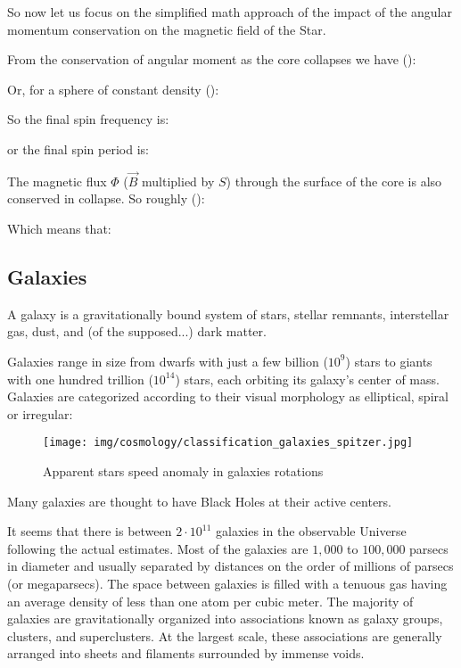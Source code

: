 	So now let us focus on the simplified math approach of the impact of the angular momentum conservation on the magnetic field of the Star. 
	
	From the conservation of angular moment as the core collapses we have ():
	
	Or,  for a sphere of constant density  ():
	
	So the final spin frequency is:
	
	or the final spin period is:
	
	The magnetic flux $\Phi$ ($\vec{B}$ multiplied by $S$) through the surface of the core is also conserved in collapse. So roughly   ():
	
	Which means that:
	
	
	\subsection{Galaxies}
	A galaxy is a gravitationally bound system of stars, stellar remnants, interstellar gas, dust, and (of the supposed...) dark matter. 

	Galaxies range in size from dwarfs with just a few billion ($10^9$) stars to giants with one hundred trillion ($10^{14}$) stars, each orbiting its galaxy's center of mass. Galaxies are categorized according to their visual morphology as elliptical, spiral or irregular:
	\begin{figure}[H]
		\begin{center}
		\texttt{[image: img/cosmology/classification\_galaxies\_spitzer.jpg]}
		\end{center}	
		\caption{Apparent stars speed anomaly in galaxies rotations}
	\end{figure}
	 Many galaxies are thought to have Black Holes at their active centers. 

	It seems that there is between $2\cdot 10^{11}$ galaxies in the observable Universe following the actual estimates. Most of the galaxies are $1,000$ to $100,000$ parsecs in diameter and usually separated by distances on the order of millions of parsecs (or megaparsecs). The space between galaxies is filled with a tenuous gas having an average density of less than one atom per cubic meter. The majority of galaxies are gravitationally organized into associations known as galaxy groups, clusters, and superclusters. At the largest scale, these associations are generally arranged into sheets and filaments surrounded by immense voids.
	

